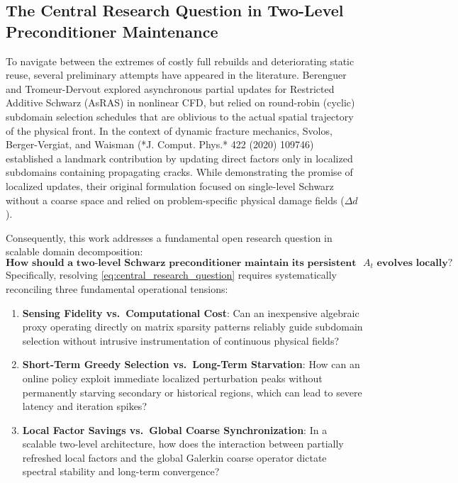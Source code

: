 \documentclass[preprint,12pt,3p]{elsarticle}
\begin{document}
\subsection{The Central Research Question in Two-Level Preconditioner Maintenance}
To navigate between the extremes of costly full rebuilds and deteriorating static reuse, several preliminary attempts have appeared in the literature. Berenguer and Tromeur-Dervout \cite{berenguer2015asynchronous} explored asynchronous partial updates for Restricted Additive Schwarz (AsRAS) in nonlinear CFD, but relied on round-robin (cyclic) subdomain selection schedules that are oblivious to the actual spatial trajectory of the physical front. In the context of dynamic fracture mechanics, Svolos, Berger-Vergiat, and Waisman \cite{svolos2020updating} (*J. Comput. Phys.* 422 (2020) 109746) established a landmark contribution by updating direct factors only in localized subdomains containing propagating cracks. While demonstrating the promise of localized updates, their original formulation focused on single-level Schwarz without a coarse space and relied on problem-specific physical damage fields ($\Delta d$).

Consequently, this work addresses a fundamental open research question in scalable domain decomposition:
\begin{equation}
\boxed{\textbf{How should a two-level Schwarz preconditioner maintain its persistent local and coarse state when } A_t \textbf{ evolves locally?}}
\label{eq:central_research_question}
\end{equation}
Specifically, resolving \eqref{eq:central_research_question} requires systematically reconciling three fundamental operational tensions:
\begin{enumerate}
    \item \textbf{Sensing Fidelity vs.\ Computational Cost}: Can an inexpensive algebraic proxy operating directly on matrix sparsity patterns reliably guide subdomain selection without intrusive instrumentation of continuous physical fields?
    \item \textbf{Short-Term Greedy Selection vs.\ Long-Term Starvation}: How can an online policy exploit immediate localized perturbation peaks without permanently starving secondary or historical regions, which can lead to severe latency and iteration spikes?
    \item \textbf{Local Factor Savings vs.\ Global Coarse Synchronization}: In a scalable two-level architecture, how does the interaction between partially refreshed local factors and the global Galerkin coarse operator dictate spectral stability and long-term convergence?
\end{enumerate}
\end{document}
